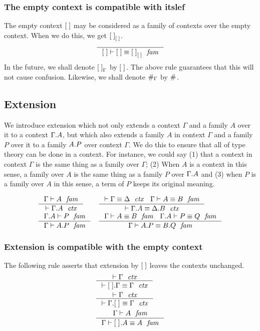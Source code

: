 \subsubsection{The empty context is compatible with itslef}
The empty context $\emptyc$ may be considered as a family of contexts over the empty
context. When we do this, we get $\emptyf[\emptyc]$.
\begin{equation}
\inference
  { }
  { \jfameq
      {\emptyc}
      {\emptyc}
      {\emptyf[\emptyc]}
    }
\end{equation}
In the future, we shall denote $\emptyf[\Gamma]$ by $\emptyf$. The above rule
guarantees that this will not cause confusion. Likewise, we shall denote
$\emptytm[\Gamma]$ by $\emptytm$.

\subsection{Extension}
We introduce extension which not only extends a context $\Gamma$ and a family
$A$ over it to a context $\ctxext{\Gamma}{A}$, but which also extends a family $A$
in context $\Gamma$ and a family $P$ over it to a family $\ctxext{A}{P}$ over context
$\Gamma$. We do this to ensure that all of type theory can be done in a context.
For instance, we could say (1) that a context in context $\Gamma$ is the same thing
as a family over $\Gamma$; (2) When $A$ is a context in this sense, a family over
$A$ is the same thing as a family $P$ over $\ctxext{\Gamma}{A}$ and 
(3) when $P$ is a family over $A$ in this sense, a term of $P$ keeps its original meaning.

\begin{align}
& \inference
  { \jfam{\Gamma}{A}
    }
  { \jctx{\ctxext{\Gamma}{A}}
    }
& & \inference
    { \jctxeq{\Gamma}{\Delta}
      \jfameq{\Gamma}{A}{B}
      }
    { \jctxeq{\ctxext{\Gamma}{A}}{\ctxext{\Delta}{B}}
      }
    \\
& \inference
  { \jfam{{\Gamma}{A}}{P}
    }
  { \jfam{\Gamma}{\ctxext{A}{P}}
    }
& & \inference
    { \jfameq{\Gamma}{A}{B} 
      \jfameq{{\Gamma}{A}}{P}{Q}
      }
    { \jfameq{\Gamma}{\ctxext{A}{P}}{\ctxext{B}{Q}}
      }
\end{align}

\subsubsection{Extension is compatible with the empty context}
The following rule asserts that extension by $\emptyc$ leaves the contexts unchanged.
\begin{align}
& \inference
  { \jctx{\Gamma}
    }
  { \jctxeq{\ctxext{\emptyc}{\Gamma}}{\Gamma}
    }
  \\
& \inference
  { \jctx{\Gamma}
    }
  { \jctxeq{\ctxext{\Gamma}{\emptyf}}{\Gamma}
    }
  \\
& \inference
  { \jfam{\Gamma}{A}
    }
  { \jfameq{\Gamma}{\ctxext{\emptyf}{A}}{A}
    }
\end{align}

